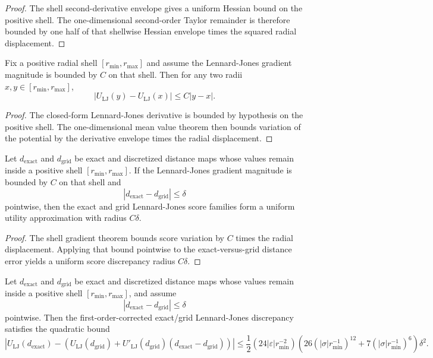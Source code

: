 \begin{proof}
The shell second-derivative envelope gives a uniform Hessian bound on the positive shell. The one-dimensional second-order Taylor remainder is therefore bounded by one half of that shellwise Hessian envelope times the squared radial displacement.
\end{proof}

\begin{theorem}\label{thm:lj-shell-grad-stability}
Fix a positive radial shell $[r_{\min}, r_{\max}]$ and assume the Lennard-Jones gradient magnitude is bounded by $C$ on that shell. Then for any two radii $x,y \in [r_{\min}, r_{\max}]$,
\[
|U_{\mathrm{LJ}}(y)-U_{\mathrm{LJ}}(x)| \le C|y-x|.
\]
\end{theorem}

\begin{proof}
The closed-form Lennard-Jones derivative is bounded by hypothesis on the positive shell. The one-dimensional mean value theorem then bounds variation of the potential by the derivative envelope times the radial displacement.
\end{proof}

\begin{theorem}\label{thm:lj-shell-uniform-approx}
Let $d_{\mathrm{exact}}$ and $d_{\mathrm{grid}}$ be exact and discretized distance maps whose values remain inside a positive shell $[r_{\min}, r_{\max}]$. If the Lennard-Jones gradient magnitude is bounded by $C$ on that shell and
\[
|d_{\mathrm{exact}}-d_{\mathrm{grid}}| \le \delta
\]
pointwise, then the exact and grid Lennard-Jones score families form a uniform utility approximation with radius $C\delta$.
\end{theorem}

\begin{proof}
The shell gradient theorem bounds score variation by $C$ times the radial displacement. Applying that bound pointwise to the exact-versus-grid distance error yields a uniform score discrepancy radius $C\delta$.
\end{proof}

\begin{theorem}\label{thm:lj-shell-quadratic-discretization}
Let $d_{\mathrm{exact}}$ and $d_{\mathrm{grid}}$ be exact and discretized distance maps whose values remain inside a positive shell $[r_{\min}, r_{\max}]$, and assume
\[
|d_{\mathrm{exact}}-d_{\mathrm{grid}}| \le \delta
\]
pointwise. Then the first-order-corrected exact/grid Lennard-Jones discrepancy satisfies the quadratic bound
\[
\left|
U_{\mathrm{LJ}}(d_{\mathrm{exact}})-
\left(U_{\mathrm{LJ}}(d_{\mathrm{grid}})+U'_{\mathrm{LJ}}(d_{\mathrm{grid}})(d_{\mathrm{exact}}-d_{\mathrm{grid}})\right)
\right|
\le
\frac{1}{2}
\left(24|\varepsilon|r_{\min}^{-2}\right)
\left(26(|\sigma|r_{\min}^{-1})^{12} + 7(|\sigma|r_{\min}^{-1})^6\right)
\delta^2.
\]
\end{theorem}

